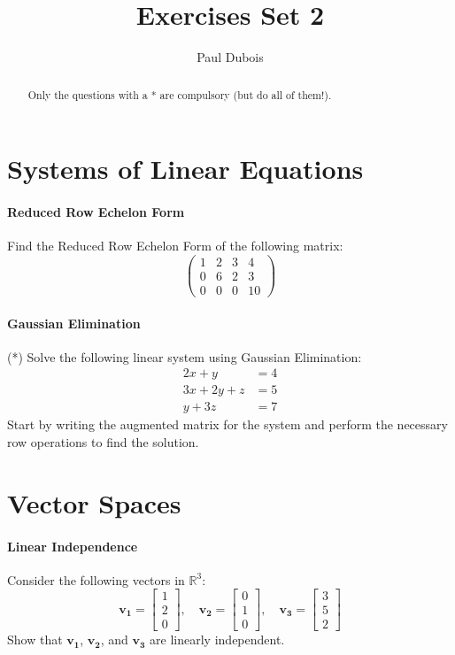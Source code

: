 \documentclass[]{article}
\title{Exercises Set 2}
\author{Paul Dubois}
\begin{document}
	
	\maketitle
	
	\begin{abstract}
		Only the questions with a * are compulsory (but do all of them!).
	\end{abstract}
	
	\section{Systems of Linear Equations}
	\paragraph{Reduced Row Echelon Form}
	Find the Reduced Row Echelon Form of the following matrix:
	$$\begin{pmatrix}
		1 & 2 & 3 & 4\\
		0 & 6 & 2 & 3\\
		0 & 0 & 0 & 10
	\end{pmatrix}$$
	
	\paragraph{Gaussian Elimination}
	(*) Solve the following linear system using Gaussian Elimination:
	\begin{align*}
		2x + y &= 4 \\
		3x + 2y + z &= 5 \\
		y + 3z &= 7
	\end{align*}
	Start by writing the augmented matrix for the system and perform the necessary row operations to find the solution.
	
	
	\section{Vector Spaces}
	\paragraph{Linear Independence}
	Consider the following vectors in $\mathbb{R}^3$:
	$$
	\mathbf{v_1} = \begin{bmatrix}
		1 \\
		2 \\
		0
	\end{bmatrix}, \quad
	\mathbf{v_2} = \begin{bmatrix}
		0 \\
		1 \\
		0
	\end{bmatrix}, \quad
	\mathbf{v_3} = \begin{bmatrix}
		3 \\
		5 \\
		2
	\end{bmatrix}
	$$
	Show that $\mathbf{v_1}$, $\mathbf{v_2}$, and $\mathbf{v_3}$ are linearly independent.
	
\end{document}
